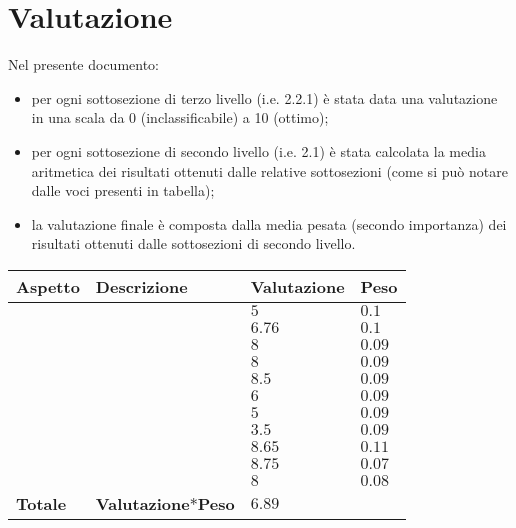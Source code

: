 \section{Valutazione}
Nel presente documento:
\begin{itemize}
	\item per ogni sottosezione di terzo livello (i.e. 2.2.1) 
	è stata data una valutazione in una scala da 0 (inclassificabile) a 10 (ottimo);
	\item per ogni sottosezione di secondo livello (i.e. 2.1) è stata calcolata
	la media aritmetica dei risultati ottenuti dalle relative sottosezioni
	(come si può notare dalle voci presenti in tabella);
	\item la valutazione finale è composta dalla media pesata 
	(secondo importanza) dei risultati ottenuti dalle sottosezioni di secondo 
	livello.
\end{itemize}

\begin{longtable}{| p{4.5cm} | p{3cm} | p{3cm} | l |}

\hline
\hline
\textbf{Aspetto} & \textbf{Descrizione} & \textbf{Valutazione} & \textbf{Peso} \\ 
\hline
\hline

\nameref{sezioni} &  & $5$ & $0.1$ \\%
\hline
\nameref{general} &  & $6.76$ & $0.1$ \\%
\hline
\nameref{where} &  & $8$ & $0.09$ \\%
\hline
\nameref{who} &  & $8$ & $0.09$ \\%
\hline
\nameref{why} &  & $8.5$ & $0.09$ \\%
\hline
\nameref{what} &  & $6$ & $0.09$ \\%
\hline
\nameref{when} &  & $5$ & $0.09$ \\%
\hline
\nameref{how} &  & $3.5$ & $0.09$ \\%
\hline
\nameref{usecase} &  & $8.65$ & $0.11$ \\%
\hline
\nameref{searchfun} &  & $8.75$ & $0.07$ \\%
\hline
\nameref{contenuto} &  & $8$ & $0.08$ \\%
\hline
\hline
\textbf{Totale} & \textbf{Valutazione$*$Peso} & \textbf{$6.89$} & \\%
\hline
\hline
\end{longtable}

